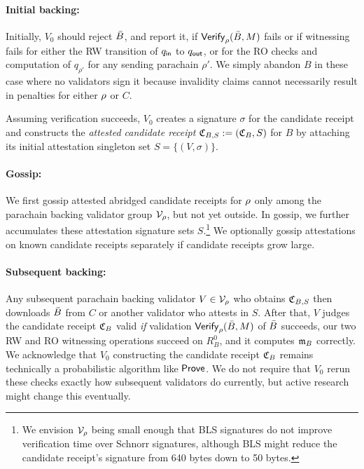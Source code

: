 \smallskip\paragraph{Initial backing:}

Initially, $V_0$ should reject $\bar{B}$, and report it, if $\mathsf{Verify}_{\rho}(\bar{B},M)$ fails or if witnessing fails for either the RW transition of $q_{\mathsf{in}}$ to $q_{\mathsf{out}}$, or for the RO checks and computation of $q_{\rho'}$ for any sending parachain $\rho'$.  We simply abandon $B$ in these case where no validators sign it because invalidity claims cannot necessarily result in penalties for either $\rho$ or $C$.  

Assuming verification succeeds, $V_0$ creates a signature $\sigma$ for the candidate receipt and constructs the {\em attested candidate receipt} $\mathfrak{C}_{B,S} := (\mathfrak{C}_B,S)$ for $B$ by attaching its initial attestation singleton set $S = \{ (V,\sigma) \}$.

\smallskip\paragraph{Gossip:}

We first gossip attested abridged candidate receipts for $\rho$ only among the parachain backing validator group $\mathcal{V}_{\rho}$, but not yet outside.
In gossip, we further accumulates these attestation signature sets $S$.\footnote{We envision $\mathcal{V}_{\rho}$ being small enough that BLS signatures do not improve verification time over Schnorr signatures, although BLS might reduce the candidate receipt's signature from 640 bytes down to 50 bytes.}  
We optionally gossip attestations on known candidate receipts separately if candidate receipts grow large.  

\smallskip\paragraph{Subsequent backing:}

Any subsequent parachain backing validator $V \in \mathcal{V}_{\rho}$ who obtains $\mathfrak{C}_{B,S}$ then downloads $\bar{B}$ from $C$ or another validator who attests in $S$.  After that, $V$ judges the candidate receipt $\mathfrak{C}_B$ valid {\em if} validation $\mathsf{Verify}_{\rho}(\bar{B},M)$ of $\bar{B}$ succeeds, our two RW and RO witnessing operations succeed on $R^0_B$, and it computes $\mathfrak{m}_B$ correctly.  
%
We acknowledge that $V_0$ constructing the candidate receipt $\mathfrak{C}_B$ remains technically a probabilistic algorithm like $\mathsf{Prove}$.  We do not require that $V_0$ rerun these checks exactly how subsequent validators do currently, but active research might change this eventually.

